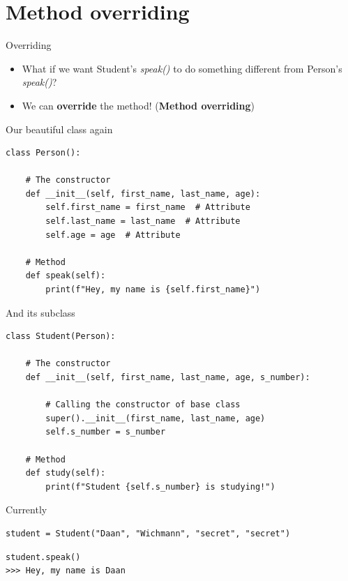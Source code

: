 \section{Method overriding}

\begin{frame}{Overriding}
\begin{itemize}
    \item What if we want Student's \textit{speak()} to do something different from Person's \textit{speak()}?
    \item We can \textbf{override} the method! (\textbf{Method overriding})
\end{itemize}
\end{frame}

\begin{frame}[fragile]{Our beautiful class again}
\begin{verbatim}
class Person():
    
    # The constructor
    def __init__(self, first_name, last_name, age):
        self.first_name = first_name  # Attribute
        self.last_name = last_name  # Attribute
        self.age = age  # Attribute

    # Method
    def speak(self):
        print(f"Hey, my name is {self.first_name}")
\end{verbatim}
\end{frame}

\begin{frame}[fragile]{And its subclass}
\begin{verbatim}
class Student(Person):

    # The constructor
    def __init__(self, first_name, last_name, age, s_number):
    
        # Calling the constructor of base class
        super().__init__(first_name, last_name, age)
        self.s_number = s_number

    # Method
    def study(self):
        print(f"Student {self.s_number} is studying!")
\end{verbatim}
\end{frame}

\begin{frame}[fragile]{Currently}

\pause
\begin{verbatim}
student = Student("Daan", "Wichmann", "secret", "secret")
\end{verbatim}

\pause
\begin{verbatim}
student.speak()
>>> Hey, my name is Daan
\end{verbatim}

\end{frame}

